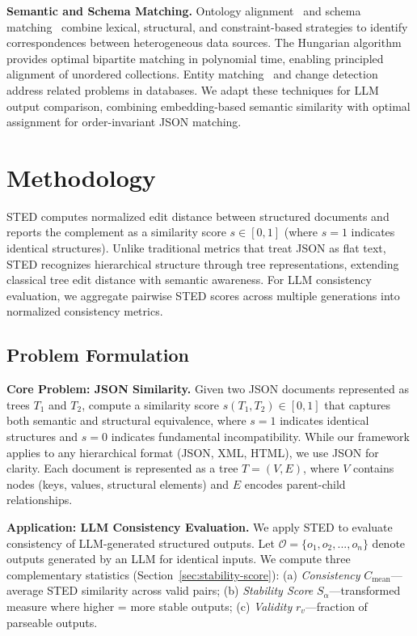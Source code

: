 \documentclass{article}
\theoremstyle{plain}
\theoremstyle{definition}
\begin{document}
\textbf{Semantic and Schema Matching.} Ontology alignment~\cite{Euzenat2013} and schema matching~\cite{Rahm2001,Do2002,Melnik2002} combine lexical, structural, and constraint-based strategies to identify correspondences between heterogeneous data sources. The Hungarian algorithm~\cite{Kuhn1955,Munkres1957} provides optimal bipartite matching in polynomial time, enabling principled alignment of unordered collections. Entity matching~\cite{Mudgal2018} and change detection~\cite{Chawathe1996} address related problems in databases. We adapt these techniques for LLM output comparison, combining embedding-based semantic similarity with optimal assignment for order-invariant JSON matching.

\section{Methodology}

STED computes normalized edit distance between structured documents and reports the complement as a similarity score $s \in [0,1]$ (where $s=1$ indicates identical structures). Unlike traditional metrics that treat JSON as flat text, STED recognizes hierarchical structure through tree representations, extending classical tree edit distance with semantic awareness. For LLM consistency evaluation, we aggregate pairwise STED scores across multiple generations into normalized consistency metrics.

\subsection{Problem Formulation}

\textbf{Core Problem: JSON Similarity.} Given two JSON documents represented as trees $T_1$ and $T_2$, compute a similarity score $s(T_1, T_2) \in [0, 1]$ that captures both semantic and structural equivalence, where $s = 1$ indicates identical structures and $s = 0$ indicates fundamental incompatibility. While our framework applies to any hierarchical format (JSON, XML, HTML), we use JSON for clarity. Each document is represented as a tree $T = (V, E)$, where $V$ contains nodes (keys, values, structural elements) and $E$ encodes parent-child relationships.

\textbf{Application: LLM Consistency Evaluation.} We apply STED to evaluate consistency of LLM-generated structured outputs. Let $\mathcal{O} = \{o_1, o_2, ..., o_n\}$ denote outputs generated by an LLM for identical inputs. We compute three complementary statistics (Section~\ref{sec:stability-score}): (a) \textit{Consistency} $C_{\text{mean}}$---average STED similarity across valid pairs; (b) \textit{Stability Score} $S_\alpha$---transformed measure where higher = more stable outputs; (c) \textit{Validity} $r_v$---fraction of parseable outputs.
\end{document}
